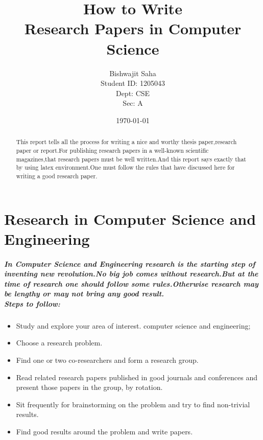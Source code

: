 \documentclass[20pt]{report}
\title{How to Write\\
Research Papers in Computer Science}
\author{Bishwajit Saha \\
		Student ID: 1205043\\
		Dept: CSE \\
		Sec: A
		}
\date{\today}
\begin{document}
  \maketitle
  \begin{abstract}
  This report tells all the process for writing a nice and worthy thesis paper,research paper or report.For publishing research papers in a well-known scientific magazines,that research papers must be well written.And this report says exactly that by using latex environment.One must follow the rules that have discussed here for writing a good research paper.
  \end{abstract}
  \tableofcontents
  
  
  \chapter{Research in Computer Science and Engineering}
  \paragraph{In Computer Science and Engineering research is the starting step of inventing new revolution.No big job comes without research.But at the time of research one should follow some rules.Otherwise research may be lengthy or may not bring any good result. \\Steps to follow:}
  \begin{itemize}
  \item Study and explore your area of interest.
computer science and engineering;
  \item Choose a research problem.
  \item Find one or two co-researchers and form a research group.
 \item Read related research papers published in good journals
and conferences and present those papers in the group, by
rotation.
 \item Sit frequently for brainstorming on the problem and try to
find non-trivial results.
\item Find good results around the problem and write papers.
  \end{itemize} 
 
\end{document}
